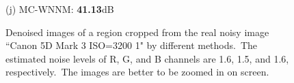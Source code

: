 \documentclass[10pt,onecolumn,letterpaper]{article}
\begin{document}
\begin{figure}[!htbp]
{\begin{minipage}[t]{0.24\textwidth}
{\footnotesize (j) MC-WNNM: \textbf{41.13}dB}
\end{minipage}
}
\caption{Denoised images of a region cropped from the real noisy image ``Canon 5D Mark 3 ISO=3200 1" \cite{crosschannel2016} by different methods.\ The estimated noise levels of R, G, and B channels are 1.6, 1.5, and 1.6, respectively.\ The images are better to be zoomed in on screen.}
\label{f11}
\end{figure}

\begin{figure}[!htbp]
\centering
{}
\end{figure}
\end{document}
